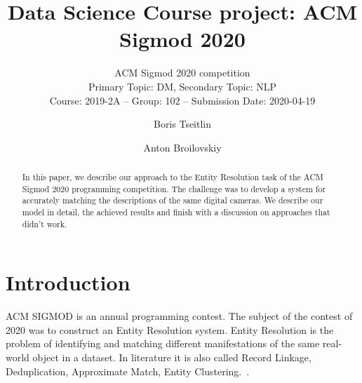 \documentclass[sigconf]{acmart}
\begin{document}
\title{Data Science Course project: ACM Sigmod 2020}
\titlenote{}
\subtitle{
ACM Sigmod 2020 competition \\
Primary Topic: DM, Secondary Topic: NLP \\
Course: 2019-2A --  Group: 102 -- Submission Date: 2020-04-19 \\
}


\author{Boris Tseitlin}

\author{Anton Broilovskiy}

\pagestyle{fancy}
\fancyhf{}
\fancyhead[LO,RE]{\thepage}

\begin{abstract}
In this paper, we describe our approach to the Entity Resolution task of the ACM Sigmod 2020 programming competition. The challenge was to develop a system for accurately matching the descriptions of the same digital cameras. We describe our model in detail, the achieved results and finish with a discussion on approaches that didn't work.
\end{abstract}

\maketitle

\section{Introduction}
\label{intro}
ACM SIGMOD is an annual programming contest. The subject of the contest of 2020 was to construct an Entity Resolution system. Entity Resolution is the problem of identifying and matching different manifestations of the same real-world object in a dataset. In literature it is also called Record Linkage, Deduplication, Approximate Match, Entity Clustering.~\cite{sigmod_website}. 
\end{document}
